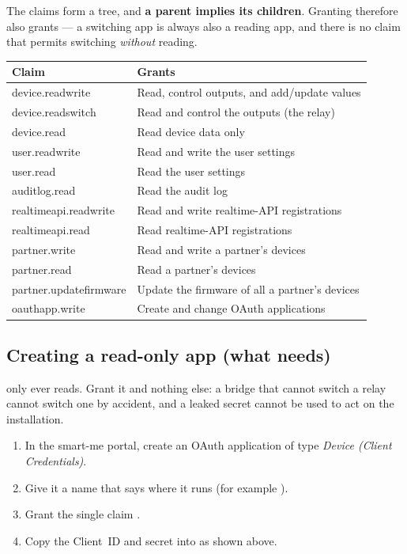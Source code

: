 The claims form a tree, and \textbf{a parent implies its children}. Granting
 therefore also grants  — a switching app is
always also a reading app, and there is no claim that permits switching \emph{without}
reading.

\begin{center}
\begin{tabular}{@{}>{\ttfamily}l p{7.6cm}@{}}
\toprule
\normalfont\textbf{Claim} & \textbf{Grants} \\
\midrule
device.readwrite      & Read, control outputs, and add/update values \\
\quad device.readswitch & Read and control the outputs (the relay) \\
\quad\quad device.read  & Read device data only \\
user.readwrite        & Read and write the user settings \\
\quad user.read       & Read the user settings \\
auditlog.read         & Read the audit log \\
realtimeapi.readwrite & Read and write realtime-API registrations \\
\quad realtimeapi.read & Read realtime-API registrations \\
partner.write         & Read and write a partner's devices \\
\quad partner.read    & Read a partner's devices \\
partner.updatefirmware & Update the firmware of all a partner's devices \\
oauthapp.write        & Create and change OAuth applications \\
\bottomrule
\end{tabular}
\end{center}

\subsection{Creating a read-only app (what \prog needs)}

\prog only ever reads. Grant it  and nothing else: a bridge that cannot
switch a relay cannot switch one by accident, and a leaked secret cannot be used to act on
the installation.

\begin{enumerate}
  \item In the smart-me portal, create an OAuth application of type
        \emph{Device (Client Credentials)}.
  \item Give it a name that says where it runs (for example ).
  \item Grant the single claim .
  \item Copy the Client~ID and secret into  as shown above.
\end{enumerate}

